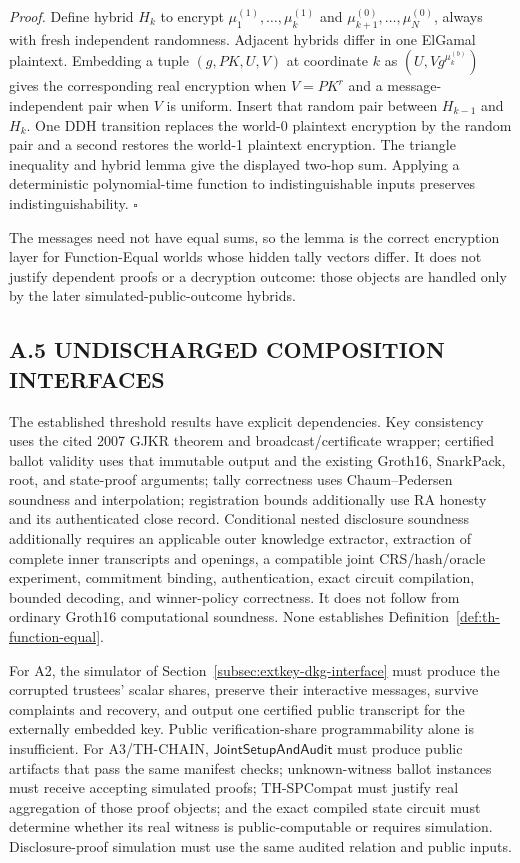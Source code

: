 \documentclass[pdflatex,sn-mathphys-num]{sn-jnl}%
\theoremstyle{thmstyleone}%
\theoremstyle{thmstyletwo}%
\theoremstyle{thmstylethree}%
\begin{document}
\begin{appendices}
\textit{Proof.}
Define hybrid $H_k$ to encrypt $\mu_1^{(1)},\ldots,\mu_k^{(1)}$ and
$\mu_{k+1}^{(0)},\ldots,\mu_N^{(0)}$, always with fresh independent
randomness.  Adjacent hybrids differ in one ElGamal plaintext.  Embedding a
tuple $(g,PK,U,V)$ at coordinate $k$ as
$(U,Vg^{\mu_k^{(b)}})$ gives the corresponding real encryption when
$V=PK^r$ and a message-independent pair when $V$ is uniform.  Insert that
random pair between $H_{k-1}$ and $H_k$.  One DDH transition replaces the
world-0 plaintext encryption by the random pair and a second restores the
world-1 plaintext encryption.  The triangle inequality and hybrid lemma give
the displayed two-hop sum.  Applying a deterministic polynomial-time function
to indistinguishable inputs preserves indistinguishability.
\hfill$\square$

The messages need not have equal sums, so the lemma is the correct encryption
layer for Function-Equal worlds whose hidden tally vectors differ.  It does
not justify dependent proofs or a decryption outcome: those objects are
handled only by the later simulated-public-outcome hybrids.

\subsection*{A.5 UNDISCHARGED COMPOSITION INTERFACES}

The established threshold results have explicit dependencies.  Key
consistency uses the cited 2007 GJKR theorem and broadcast/certificate wrapper;
certified ballot validity uses that immutable output and the existing
Groth16, SnarkPack, root, and state-proof arguments; tally correctness uses
Chaum--Pedersen soundness and interpolation; registration bounds additionally
use RA honesty and its authenticated close record.  Conditional nested
disclosure soundness additionally requires an applicable outer knowledge
extractor, extraction of complete inner transcripts and openings, a compatible
joint CRS/hash/oracle experiment, commitment binding, authentication, exact
circuit compilation, bounded decoding, and winner-policy correctness.  It
does not follow from ordinary Groth16 computational soundness.  None establishes
Definition~\ref{def:th-function-equal}.

For A2, the simulator of Section~\ref{subsec:extkey-dkg-interface} must
produce the corrupted trustees' scalar shares, preserve their interactive
messages, survive complaints and recovery, and output one certified public
transcript for the externally embedded key.  Public verification-share
programmability alone is insufficient.  For A3/TH-CHAIN,
$\mathsf{JointSetupAndAudit}$ must produce public artifacts that pass the same
manifest checks; unknown-witness ballot instances must receive accepting
simulated proofs; TH-SPCompat must justify real aggregation of those proof
objects; and the exact compiled state circuit must determine whether its real
witness is public-computable or requires simulation.  Disclosure-proof
simulation must use the same audited relation and public inputs.


\end{appendices}
\end{document}
